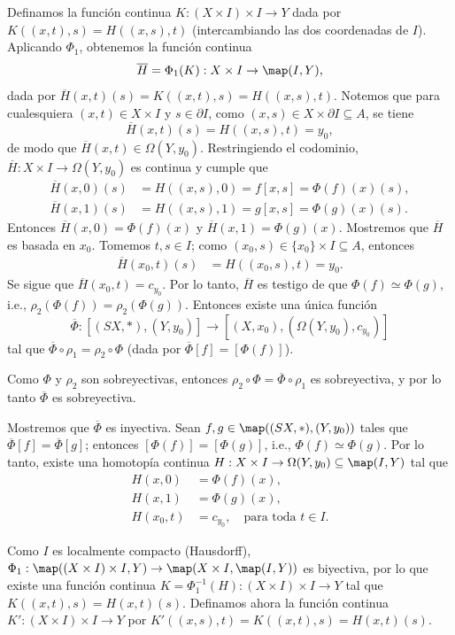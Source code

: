 \begin{demostracion}
Definamos la función continua $K:(X\times I)\times I\to Y$ dada por $K((x,t),s)=H((x,s),t)$ (intercambiando las dos coordenadas de $I$). Aplicando $\Phi_1$, obtenemos la función continua
\[
    \overline{H}=\Phi_1(K):X\times I\to \map(I,Y),
\]
dada por $\overline{H}(x,t)(s)=K((x,t),s)=H((x,s),t)$. Notemos que para cualesquiera $(x,t)\in X\times I$ y $s\in \partial I$, como $(x,s)\in X\times \partial I\subseteq A$, se tiene
\[
    \overline{H}(x,t)(s)=H((x,s),t)=y_0,
\]
de modo que $\overline{H}(x,t)\in \Omega(Y,y_0)$. Restringiendo el codominio, $\overline{H}:X\times I\to \Omega(Y,y_0)$ es continua y cumple que
\begin{align*}
    \overline{H}(x,0)(s)&=H((x,s),0)=f[x,s]=\Phi(f)(x)(s),\\
    \overline{H}(x,1)(s)&=H((x,s),1)=g[x,s]=\Phi(g)(x)(s).
\end{align*}
Entonces $\overline{H}(x,0)=\Phi(f)(x)$ y $\overline{H}(x,1)=\Phi(g)(x)$. Mostremos que $\overline{H}$ es basada en $x_0$. Tomemos $t,s\in I$; como $(x_0,s)\in \{x_0\}\times I\subseteq A$, entonces
\begin{align*}
    \overline{H}(x_0,t)(s)&=H((x_0,s),t)=y_0.
\end{align*}
Se sigue que $\overline{H}(x_0,t)=c_{y_0}$. Por lo tanto, $\overline{H}$ es testigo de que $\Phi(f)\simeq \Phi(g)$, i.e., $\rho_2(\Phi(f))=\rho_2(\Phi(g))$. Entonces existe una única función
\[
    \overline{\Phi}:[(SX,*),(Y,y_0)] \to [(X,x_0),(\Omega(Y,y_0),c_{y_0})]
\]
tal que $\overline{\Phi}\circ \rho_1=\rho_2\circ \Phi$ (dada por $\overline{\Phi}[f]=[\Phi(f)]$).

Como $\Phi$ y $\rho_2$ son sobreyectivas, entonces $\rho_2\circ\Phi=\overline{\Phi}\circ\rho_1$ es sobreyectiva, y por lo tanto $\overline{\Phi}$ es sobreyectiva.

Mostremos que $\overline{\Phi}$ es inyectiva. Sean $f,g\in \map((SX,*),(Y,y_0))$ tales que $\overline{\Phi}[f]=\overline{\Phi}[g]$; entonces $[\Phi(f)]=[\Phi(g)]$, i.e., $\Phi(f)\simeq \Phi(g)$. Por lo tanto, existe una homotopía continua $H:X\times I\to \Omega(Y,y_0)\subseteq \map(I,Y)$ tal que
\begin{align*}
    H(x,0)&=\Phi(f)(x),\\
    H(x,1)&=\Phi(g)(x),\\
    H(x_0,t)&=c_{y_0}, \quad \text{para toda } t\in I.
\end{align*}

Como $I$ es localmente compacto (Hausdorff), $\Phi_1:\map((X\times I)\times I,Y)\to \map(X\times I,\map(I,Y))$ es biyectiva, por lo que existe una función continua $K=\Phi_1^{-1}(H):(X\times I)\times I\to Y$ tal que $K((x,t),s)=H(x,t)(s)$. Definamos ahora la función continua $K':(X\times I)\times I\to Y$ por $K'((x,s),t)=K((x,t),s)=H(x,t)(s)$.


\end{demostracion}
